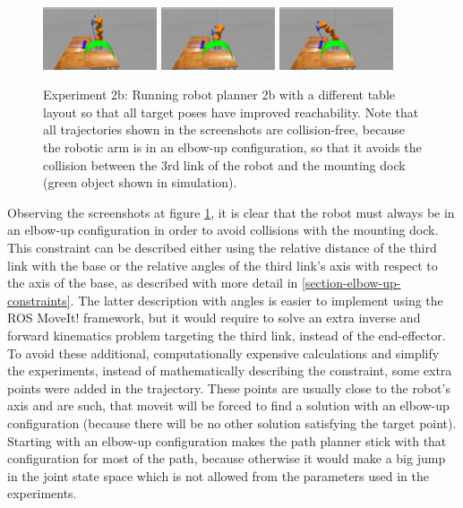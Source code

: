 \begin{center}
\begin{figure}[!htb]
\includegraphics[width=0.3\textwidth]{images/robot_planner2b/robot_planner2b_7}
\includegraphics[width=0.3\textwidth]{images/robot_planner2b/robot_planner2b_8}
\includegraphics[width=0.3\textwidth]{images/robot_planner2b/robot_planner2b_9}\\
\caption{Experiment 2b: Running robot planner 2b with a different table layout so that all target poses have improved reachability. Note that all trajectories shown in the screenshots are collision-free, 
because the robotic arm is in an elbow-up configuration, so that it avoids the collision between the 3rd link of the robot and the mounting dock (green object shown in simulation).}
\label{experiment-robot-planner2b}
\end{figure}
\end{center}

Observing the screenshots at figure \ref{experiment-robot-planner2b}, it is clear that the robot must always be in an elbow-up configuration in order to avoid collisions with the mounting dock. This constraint can be 
described either using the relative distance of the third link with the base or the relative angles of the third link's axis with respect to the axis of the base, as described with more detail in 
\ref{section-elbow-up-constraints}. The latter description with angles is easier to implement using the ROS MoveIt! framework,  but it would require to solve an extra inverse and forward kinematics problem targeting the third 
link, instead of the end-effector. To avoid these additional, computationally expensive calculations and simplify the experiments, instead of mathematically describing the constraint, 
some extra points were added in the trajectory. 
These points are usually close to the robot's axis and are such, that 
moveit will be forced to find a solution with an elbow-up configuration (because there will be no other solution satisfying the target point). Starting with an elbow-up configuration makes the path planner stick with that 
configuration for most of the path, because otherwise it would make a big jump in the joint state space which is not allowed from the parameters used in the experiments.

